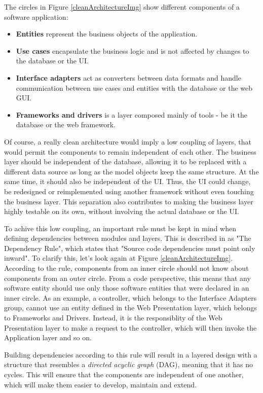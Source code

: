 The circles in Figure \ref{cleanArchitectureImg} show different components of a software application:

\begin{itemize}
    \item \textbf{Entities} represent the business objects of the application.
    \item \textbf{Use cases} encapsulate the business logic and is not affected by changes to the database or the UI.
    \item \textbf{Interface adapters} act as converters between data formats and handle communication between use cases and entities with the database or the web GUI.
    \item \textbf{Frameworks and drivers} is a layer composed mainly of tools - be it the database or the web framework.
\end{itemize}

Of course, a really clean architecture would imply a low coupling of layers, that would permit the components to remain independent of each other. The business layer should be independent of the database, allowing it to be replaced with a different data source as long as the model objects keep the same structure. At the same time, it should also be independent of the UI. Thus, the UI could change, be redesigned or reimplemented using another framework without even touching the business layer. This separation also contributes to making the business layer highly testable on its own, without involving the actual database or the UI.

To achive this low coupling, an important rule must be kept in mind when defining dependencies between modules and layers. This is described in \cite{cleanArchitecture} as "The Dependency Rule", which states that "Source code dependencies must point only inward". To clarify this, let's look again at Figure \ref{cleanArchitectureImg}. According to the rule, components from an inner circle should not know about components from an outer circle. From a code perspective, this means that any software entity should use only those software entities that were declared in an inner circle. As an example, a controller, which belongs to the Interface Adapters group, cannot use an entity defined in the Web Presentation layer, which belongs to Frameworks and Drivers. Instead, it is the responsiblity of the Web Presentation layer to make a request to the controller, which will then invoke the Application layer and so on.

Building dependencies according to this rule will result in a layered design with a structure that resembles a \textit{directed acyclic graph} (DAG), meaning that it has no cycles. This will ensure that the components are independent of one another, which will make them easier to develop, maintain and extend.



